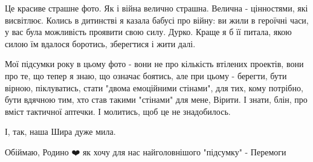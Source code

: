 Це красиве страшне фото. Як і війна велично страшна. Велична - цінностями, які
висвітлює. Колись в дитинстві я казала бабусі про війну: ви жили в героїчні
часи, у вас була можливість проявити свою силу. Дурко. Краще я б її питала,
якою силою їм вдалося боротись, зберегтися  і жити далі.  

Мої підсумки року в цьому фото - вони не про кількість втілених проектів, вони
про те, що тепер я знаю, що означає боятись, але при цьому - берегти, бути
вірною, піклуватись, стати "двома емоційними стінами", для тих, кому потрібно,
бути вдячною тим, хто став такими "стінами" для мене, Вірити. І знати, блін,
про вміст тактичної аптечки. І молитись, щоб це не знадобилось. 

І, так, наша Шира дуже мила. 

Обіймаю, Родино ❤️ як хочу для нас найголовнішого "підсумку" - Перемоги
